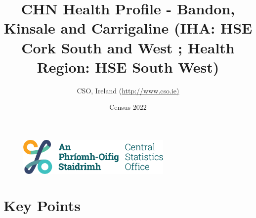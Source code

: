 \documentclass{article}
\title{CHN Health Profile - Bandon, Kinsale and Carrigaline (IHA: HSE Cork South and West ;  Health Region: HSE South West) }
\date{Census 2022}
\author{CSO, Ireland  (\url{http://www.cso.ie)}}
\begin{document}


\begin{figure}
	\centering
\includegraphics[width =75mm]{../figures/CSO_Logo.png}
\end{figure}

				 
		   
						  
														  
																																													
												 
			 
\maketitle
					
													   
				 
						 
																																																																											   
				 
				  
  \pagebreak
    	    \tableofcontents

\pagebreak


\section{Key Points}
\end{document}
